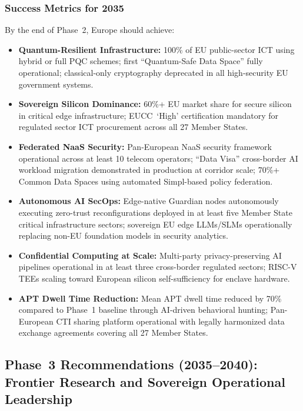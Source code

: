 \documentclass{ieeeaccess}
\begin{document}
\subsubsection*{Success Metrics for 2035}
By the end of Phase~2, Europe should achieve:
\begin{itemize}
    \item \textbf{Quantum-Resilient Infrastructure:}
    100\% of EU public-sector ICT using hybrid or full PQC schemes;
    first ``Quantum-Safe Data Space'' fully operational;
    classical-only cryptography deprecated in all high-security EU
    government systems.

    \item \textbf{Sovereign Silicon Dominance:}
    60\%+ EU market share for secure silicon in critical edge
    infrastructure; EUCC~`High' certification mandatory for regulated
    sector ICT procurement across all 27 Member States.

    \item \textbf{Federated NaaS Security:}
    Pan-European NaaS security framework operational across at least
    10 telecom operators; ``Data Visa'' cross-border AI workload
    migration demonstrated in production at corridor scale; 70\%+
    Common Data Spaces using automated Simpl-based policy federation.

    \item \textbf{Autonomous AI SecOps:}
    Edge-native Guardian nodes autonomously executing zero-trust
    reconfigurations deployed in at least five Member State critical
    infrastructure sectors; sovereign EU edge LLMs/SLMs operationally
    replacing non-EU foundation models in security analytics.

    \item \textbf{Confidential Computing at Scale:}
    Multi-party privacy-preserving AI pipelines operational in at
    least three cross-border regulated sectors; RISC-V TEEs scaling
    toward European silicon self-sufficiency for enclave hardware.

    \item \textbf{APT Dwell Time Reduction:}
    Mean APT dwell time reduced by 70\% compared to Phase~1 baseline
    through AI-driven behavioral hunting; Pan-European CTI sharing
    platform operational with legally harmonized data exchange
    agreements covering all 27 Member States.
\end{itemize}

\subsection*{Phase~3 Recommendations (2035--2040):
             Frontier Research and Sovereign Operational Leadership}
\end{document}
